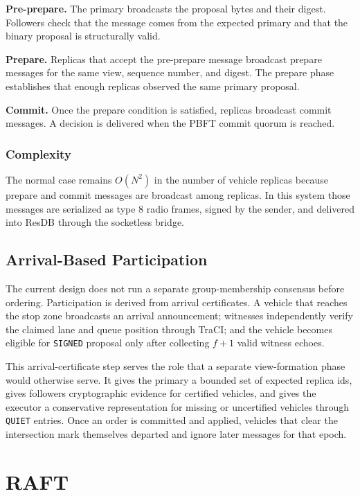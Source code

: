 \documentclass[fleqn,10pt]{olplainarticle}
\begin{document}
\textbf{Pre-prepare.} The primary broadcasts the proposal bytes and their digest. Followers check that the message comes from the expected primary and that the binary proposal is structurally valid.

\textbf{Prepare.} Replicas that accept the pre-prepare message broadcast prepare messages for the same view, sequence number, and digest. The prepare phase establishes that enough replicas observed the same primary proposal.

\textbf{Commit.} Once the prepare condition is satisfied, replicas broadcast commit messages. A decision is delivered when the PBFT commit quorum is reached.

\subsubsection{Complexity}

The normal case remains $O(N^2)$ in the number of vehicle replicas because prepare and commit messages are broadcast among replicas. In this system those messages are serialized as type 8 radio frames, signed by the sender, and delivered into ResDB through the socketless bridge.

\subsection{Arrival-Based Participation}

The current design does not run a separate group-membership consensus before ordering. Participation is derived from arrival certificates. A vehicle that reaches the stop zone broadcasts an arrival announcement; witnesses independently verify the claimed lane and queue position through TraCI; and the vehicle becomes eligible for \texttt{SIGNED} proposal only after collecting $f+1$ valid witness echoes.

This arrival-certificate step serves the role that a separate view-formation phase would otherwise serve. It gives the primary a bounded set of expected replica ids, gives followers cryptographic evidence for certified vehicles, and gives the executor a conservative representation for missing or uncertified vehicles through \texttt{QUIET} entries. Once an order is committed and applied, vehicles that clear the intersection mark themselves departed and ignore later messages for that epoch.


\section{RAFT}
\end{document}
